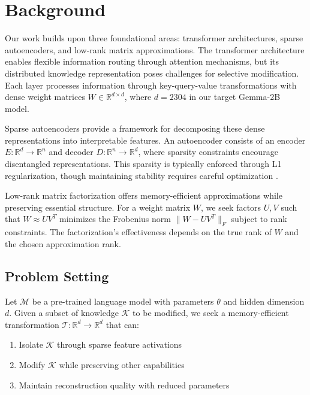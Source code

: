 \documentclass{article} %
\begin{document}
\section{Background}
\label{sec:background}

Our work builds upon three foundational areas: transformer architectures, sparse autoencoders, and low-rank matrix approximations. The transformer architecture \cite{vaswani2017attention} enables flexible information routing through attention mechanisms, but its distributed knowledge representation poses challenges for selective modification. Each layer processes information through key-query-value transformations with dense weight matrices $W \in \mathbb{R}^{d \times d}$, where $d=2304$ in our target Gemma-2B model.

Sparse autoencoders \cite{goodfellow2016deep} provide a framework for decomposing these dense representations into interpretable features. An autoencoder consists of an encoder $E: \mathbb{R}^d \rightarrow \mathbb{R}^n$ and decoder $D: \mathbb{R}^n \rightarrow \mathbb{R}^d$, where sparsity constraints encourage disentangled representations. This sparsity is typically enforced through L1 regularization, though maintaining stability requires careful optimization \cite{kingma2014adam}.

Low-rank matrix factorization offers memory-efficient approximations while preserving essential structure. For a weight matrix $W$, we seek factors $U, V$ such that $W \approx UV^T$ minimizes the Frobenius norm $\|W - UV^T\|_F$ subject to rank constraints. The factorization's effectiveness depends on the true rank of $W$ and the chosen approximation rank.

\subsection{Problem Setting}
\label{subsec:problem}

Let $\mathcal{M}$ be a pre-trained language model with parameters $\theta$ and hidden dimension $d$. Given a subset of knowledge $\mathcal{K}$ to be modified, we seek a memory-efficient transformation $\mathcal{T}: \mathbb{R}^d \rightarrow \mathbb{R}^d$ that can:
\begin{enumerate}
    \item Isolate $\mathcal{K}$ through sparse feature activations
    \item Modify $\mathcal{K}$ while preserving other capabilities
    \item Maintain reconstruction quality with reduced parameters
\end{enumerate}
\end{document}
